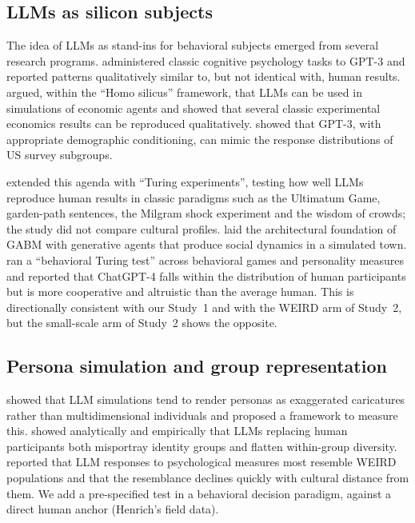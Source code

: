 \documentclass[11pt]{article}
\begin{document}
\subsection{LLMs as silicon subjects}

The idea of LLMs as stand-ins for behavioral subjects emerged from several research programs. \citet{binz2023} administered classic cognitive psychology tasks to GPT-3 and reported patterns qualitatively similar to, but not identical with, human results. \citet{horton2023} argued, within the ``Homo silicus'' framework, that LLMs can be used in simulations of economic agents and showed that several classic experimental economics results can be reproduced qualitatively. \citet{argyle2023} showed that GPT-3, with appropriate demographic conditioning, can mimic the response distributions of US survey subgroups.

\citet{aher2023} extended this agenda with ``Turing experiments'', testing how well LLMs reproduce human results in classic paradigms such as the Ultimatum Game, garden-path sentences, the Milgram shock experiment and the wisdom of crowds; the study did not compare cultural profiles. \citet{park2023} laid the architectural foundation of GABM with generative agents that produce social dynamics in a simulated town. \citet{mei2024} ran a ``behavioral Turing test'' across behavioral games and personality measures and reported that ChatGPT-4 falls within the distribution of human participants but is more cooperative and altruistic than the average human. This is directionally consistent with our Study~1 and with the WEIRD arm of Study~2, but the small-scale arm of Study~2 shows the opposite.

\subsection{Persona simulation and group representation}

\citet{cheng2023compost} showed that LLM simulations tend to render personas as exaggerated caricatures rather than multidimensional individuals and proposed a framework to measure this. \citet{wang2025misportray} showed analytically and empirically that LLMs replacing human participants both misportray identity groups and flatten within-group diversity. \citet{atari2023which} reported that LLM responses to psychological measures most resemble WEIRD populations and that the resemblance declines quickly with cultural distance from them. We add a pre-specified test in a behavioral decision paradigm, against a direct human anchor (Henrich's field data).
\end{document}
